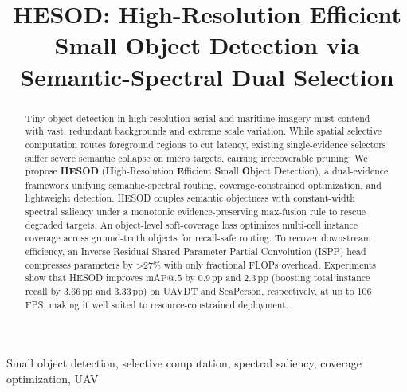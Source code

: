 \documentclass{article}
\title{HESOD: High-Resolution Efficient Small Object Detection via Semantic-Spectral Dual Selection}
\begin{document}
\ninept
\raggedbottom
\setlength{\abovedisplayskip}{2pt plus 1pt minus 1pt}
\setlength{\belowdisplayskip}{2pt plus 1pt minus 1pt}
\setlength{\abovedisplayshortskip}{1.0pt plus 1pt}
\setlength{\belowdisplayshortskip}{1.0pt plus 1pt minus 1pt}
\maketitle

\begin{abstract}
Tiny-object detection in high-resolution aerial and maritime imagery must contend with vast, redundant backgrounds and extreme scale variation. While spatial selective computation routes foreground regions to cut latency, existing single-evidence selectors suffer severe semantic collapse on micro targets, causing irrecoverable pruning. We propose \textbf{HESOD} (\textbf{H}igh-Resolution \textbf{E}fficient \textbf{S}mall \textbf{O}bject \textbf{D}etection), a dual-evidence framework unifying semantic-spectral routing, coverage-constrained optimization, and lightweight detection. HESOD couples semantic objectness with constant-width spectral saliency under a monotonic evidence-preserving max-fusion rule to rescue degraded targets. An object-level soft-coverage loss optimizes multi-cell instance coverage across ground-truth objects for recall-safe routing. To recover downstream efficiency, an Inverse-Residual Shared-Parameter Partial-Convolution (ISPP) head compresses parameters by \textgreater27\% with only fractional FLOPs overhead. Experiments show that HESOD improves $\mathrm{mAP@.5}$ by 0.9\,pp and 2.3\,pp (boosting total instance recall by 3.66\,pp and 3.33\,pp) on UAVDT and SeaPerson, respectively, at up to 106 FPS, making it well suited to resource-constrained deployment.
\end{abstract}

\begin{keywords}
Small object detection, selective computation, spectral saliency, coverage optimization, UAV
\end{keywords}







\clearpage
\begingroup
\small
\setlength{\itemsep}{0pt plus 0.2ex}
\setlength{\parsep}{0pt}


\endgroup
\end{document}
